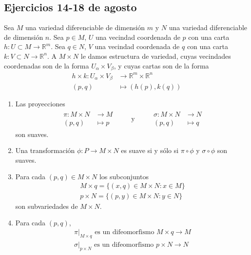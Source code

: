 \documentclass[spanish]{book}
\theoremstyle{definition}
\newcommand{\R}{\mathbb{R}}
\begin{document}
\clearpage
\subsection{Ejercicios 14-18 de agosto}
Sea $M$ una variedad diferenciable de dimensión $m$ y $N$ una variedad diferenciable de dimensión $n$. Sea $p\in M$, $U$ una vecindad coordenada de $p$ con una carta $h:U\subset M\to\R^m$. Sea $q\in N$, $V$ una vecindad coordenada de $q$ con una carta $k:V\subset N\to\R^n$. A $M\times N$ le damos estructura de variedad, cuyas vecindades coordenadas son de la forma $U_\alpha\times V_\beta$, y cuyas cartas son de la forma 
\begin{align*}
	h\times k:U_\alpha\times V_\beta&\to\R^m\times\R^n\\
	(p,q)&\mapsto \left(h(p),k(q)\right)
\end{align*}
\begin{enumerate}
	\item Las proyecciones 
	\begin{align*}
		\begin{aligned}
			\pi:M\times N&\to M\\
			(p,q)&\mapsto p
		\end{aligned}
		\qquad\text{ y }\qquad
		\begin{aligned}
			\sigma:M\times N&\to N\\
			(p,q)&\mapsto q
		\end{aligned}
	\end{align*}
	son suaves.
	
	\item Una transformación $\phi:P\to M\times N$ es suave si y sólo si $\pi\circ\phi$ y $\sigma\circ\phi$ son suaves.
	\item Para cada $(p,q)\in M\times N$ los subconjuntos
	\begin{align*}
		M\times q=\{(x,q)\in M\times N:x\in M\}\\
		p\times N=\{(p,y)\in M\times N:y\in N\}
	\end{align*}
	son subvariedades de $M\times N$.
	\item Para cada $(p,q)$,
	\begin{align*}
		\pi|_{M\times q}\text{ es un difeomorfismo }M\times q\to M\\
		\sigma|_{p\times N}\text{ es un difeomorfismo }p\times N\to N
	\end{align*}
\end{enumerate}
\end{document}
